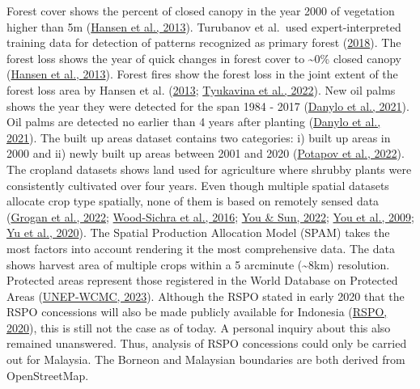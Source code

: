 \documentclass[
  letterpaper,
  DIV=11,
  numbers=noendperiod]{scrreprt}
\begin{document}
Forest cover shows the percent of closed canopy in the year 2000 of
vegetation higher than 5m
(\protect\hyperlink{ref-hansenHighResolutionGlobalMaps2013}{Hansen et
al., 2013}). Turubanov et al.~used expert-interpreted training data for
detection of patterns recognized as primary forest
(\protect\hyperlink{ref-turubanovaOngoingPrimaryForest2018}{2018}). The
forest loss shows the year of quick changes in forest cover to
\textasciitilde0\% closed canopy
(\protect\hyperlink{ref-hansenHighResolutionGlobalMaps2013}{Hansen et
al., 2013}). Forest fires show the forest loss in the joint extent of
the forest loss area by Hansen et al.
(\protect\hyperlink{ref-hansenHighResolutionGlobalMaps2013}{2013};
\protect\hyperlink{ref-tyukavinaGlobalTrendsForest2022}{Tyukavina et
al., 2022}). New oil palms shows the year they were detected for the
span 1984 - 2017 (\protect\hyperlink{ref-danyloMapExtentYear2021}{Danylo
et al., 2021}). Oil palms are detected no earlier than 4 years after
planting (\protect\hyperlink{ref-danyloMapExtentYear2021}{Danylo et al.,
2021}). The built up areas dataset contains two categories: i) built up
areas in 2000 and ii) newly built up areas between 2001 and 2020
(\protect\hyperlink{ref-potapovGlobal20002020Land2022}{Potapov et al.,
2022}). The cropland datasets shows land used for agriculture where
shrubby plants were consistently cultivated over four years. Even though
multiple spatial datasets allocate crop type spatially, none of them is
based on remotely sensed data
(\protect\hyperlink{ref-groganGlobalGriddedCrop2022}{Grogan et al.,
2022};
\protect\hyperlink{ref-wood-sichraSpatialProductionAllocation2016}{Wood-Sichra
et al., 2016}; \protect\hyperlink{ref-youMappingGlobalCropping2022}{You
\& Sun, 2022};
\protect\hyperlink{ref-youGeneratingPlausibleCrop2009}{You et al.,
2009}; \protect\hyperlink{ref-yuCultivatedPlanet20102020}{Yu et al.,
2020}). The Spatial Production Allocation Model (SPAM) takes the most
factors into account rendering it the most comprehensive data. The data
shows harvest area of multiple crops within a 5 arcminute
(\textasciitilde8km) resolution. Protected areas represent those
registered in the World Database on Protected Areas
(\protect\hyperlink{ref-unep-wcmcProtectedAreaProfile2023}{UNEP-WCMC,
2023}). Although the RSPO stated in early 2020 that the RSPO concessions
will also be made publicly available for Indonesia
(\protect\hyperlink{ref-rspoRSPOMEMBERSCONCESSION2020}{RSPO, 2020}),
this is still not the case as of today. A personal inquiry about this
also remained unanswered. Thus, analysis of RSPO concessions could only
be carried out for Malaysia. The Borneon and Malaysian boundaries are
both derived from OpenStreetMap.
\end{document}
